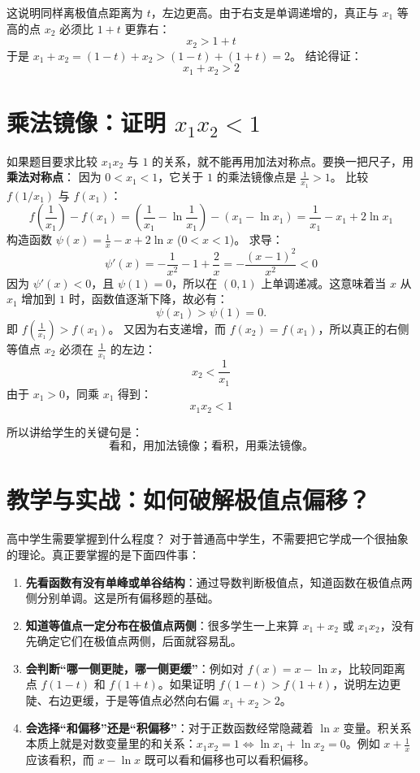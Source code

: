 \documentclass[11pt,a4paper]{ctexart}
\begin{document}
这说明同样离极值点距离为 $t$，左边更高。由于右支是单调递增的，真正与 $x_1$ 等高的点 $x_2$ 必须比 $1+t$ 更靠右：
\[
x_2 > 1+t
\]
于是 $x_1+x_2 = (1-t) + x_2 > (1-t) + (1+t) = 2$。
结论得证：
\[
\boxed{x_1+x_2>2}
\]

\section{乘法镜像：证明 $x_1x_2<1$}
如果题目要求比较 $x_1x_2$ 与 $1$ 的关系，就不能再用加法对称点。要换一把尺子，用\textbf{乘法对称点}：
因为 $0<x_1<1$，它关于 $1$ 的乘法镜像点是 $\frac{1}{x_1}>1$。
比较 $f(1/x_1)$ 与 $f(x_1)$：
\[
f\left(\frac{1}{x_1}\right) - f(x_1) = \left(\frac{1}{x_1} - \ln\frac{1}{x_1}\right) - (x_1 - \ln x_1) = \frac{1}{x_1} - x_1 + 2\ln x_1
\]
构造函数 $\psi(x) = \frac{1}{x} - x + 2\ln x$ ($0<x<1$)。
求导：
\[
\psi'(x) = -\frac{1}{x^2} - 1 + \frac{2}{x} = -\frac{(x-1)^2}{x^2} < 0
\]
因为 $\psi'(x)<0$，且 $\psi(1)=0$，所以在 $(0,1)$ 上单调递减。这意味着当 $x$ 从 $x_1$ 增加到 $1$ 时，函数值逐渐下降，故必有：
\[
\psi(x_1)>\psi(1)=0.
\]
即 $f\left(\frac{1}{x_1}\right) > f(x_1)$。
又因为右支递增，而 $f(x_2)=f(x_1)$，所以真正的右侧等值点 $x_2$ 必须在 $\frac{1}{x_1}$ 的左边：
\[
x_2 < \frac{1}{x_1}
\]
由于 $x_1>0$，同乘 $x_1$ 得到：
\[
\boxed{x_1x_2<1}
\]

所以讲给学生的关键句是：
\[
\boxed{\text{看和，用加法镜像；看积，用乘法镜像。}}
\]

\section{教学与实战：如何破解极值点偏移？}

\begin{teachbox}{高中学生需要掌握到什么程度？}
对于普通高中学生，不需要把它学成一个很抽象的理论。真正要掌握的是下面四件事：
\begin{enumerate}
    \item \textbf{先看函数有没有单峰或单谷结构}：通过导数判断极值点，知道函数在极值点两侧分别单调。这是所有偏移题的基础。
    \item \textbf{知道等值点一定分布在极值点两侧}：很多学生一上来算 $x_1+x_2$ 或 $x_1x_2$，没有先确定它们在极值点两侧，后面就容易乱。
    \item \textbf{会判断“哪一侧更陡，哪一侧更缓”}：例如对 $f(x)=x-\ln x$，比较同距离点 $f(1-t)$ 和 $f(1+t)$。如果证明 $f(1-t)>f(1+t)$，说明左边更陡、右边更缓，于是等值点必然向右偏 $x_1+x_2>2$。
    \item \textbf{会选择“和偏移”还是“积偏移”}：对于正数函数经常隐藏着 $\ln x$ 变量。积关系本质上就是对数变量里的和关系：$x_1x_2=1 \Longleftrightarrow \ln x_1+\ln x_2=0$。例如 $x+\frac{1}{x}$ 应该看积，而 $x-\ln x$ 既可以看和偏移也可以看积偏移。
\end{enumerate}
\end{teachbox}
\end{document}
